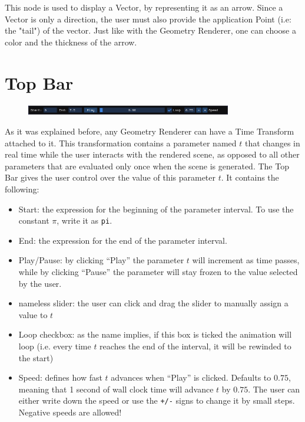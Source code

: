 This node is used to display a Vector, by representing it as an arrow.
Since a Vector is only a direction, the user must also provide the application Point (i.e: the "tail") of the vector.
Just like with the Geometry Renderer, one can choose a color and the thickness of the arrow.

\section{Top Bar}

\begin{figure}[H]
\centering
\includegraphics[width=0.8\textwidth]{figures/top_bar.png}
\end{figure}

As it was explained before, any Geometry Renderer can have a Time Transform attached to it.
This transformation contains a parameter named $t$ that changes in real time while the
user interacts with the rendered scene, as opposed to all other parameters that are evaluated
only once when the scene is generated.
The Top Bar gives the user control over the value of this parameter $t$. It contains the following:

\begin{itemize}
    \item Start: the expression for the beginning of the parameter interval. To use
        the constant $\pi$, write it as \texttt{pi}.
    \item End: the expression for the end of the parameter interval.
    \item Play/Pause: by clicking ``Play'' the parameter $t$ will increment as time passes,
        while by clicking ``Pause'' the parameter will stay frozen to the value selected by the user.
    \item nameless slider: the user can click and drag the slider to manually assign a value to $t$
    \item Loop checkbox: as the name implies, if this box is ticked the animation will loop
        (i.e. every time $t$ reaches the end of the interval, it will be rewinded to the start)
    \item Speed: defines how fast $t$ advances when ``Play'' is clicked. Defaults to $0.75$,
        meaning that 1 second of wall clock time will advance $t$ by $0.75$. The user can either
        write down the speed or use the \texttt{+/-} signs to change it by small steps.
        Negative speeds are allowed!
\end{itemize}


